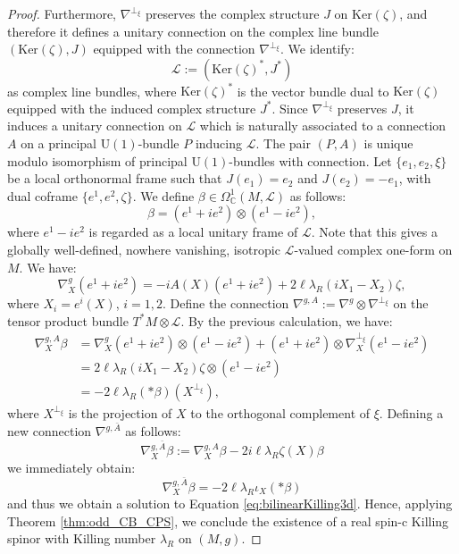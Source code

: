 \documentclass[10pt,a4paper,twoside,reqno]{amsart}
\theoremstyle{plain}
\theoremstyle{definition}
\theoremstyle{remark}
\def\U{\mathrm{U}}
\def\cL{\mathcal{L}}
\renewcommand{\ker}{\mathrm{Ker}}
\begin{document}
\begin{proof}
\noindent
Furthermore, $\nabla^{\perp_{\xi}}$ preserves the complex structure $J$ on $\ker(\zeta)$, and therefore it defines a unitary connection on the complex line bundle $(\ker(\zeta),J)$ equipped with the connection $\nabla^{\perp_{\xi}}$. We identify:
\begin{equation*}
\cL := (\ker(\zeta)^{\ast},J^{\ast})
\end{equation*}
as complex line bundles, where $\ker(\zeta)^{\ast}$ is the vector bundle dual to $\ker(\zeta)$ equipped with the induced complex structure $J^*$. Since $\nabla^{\perp_{\xi}}$ preserves $J$, it induces a unitary connection on $\cL$ which is naturally associated to a connection $A$ on a principal $\U(1)$-bundle $P$ inducing $\cL$. The pair $(P,A)$ is unique modulo isomorphism of principal $\U(1)$-bundles with connection. Let $\{e_1, e_2, \xi\}$ be a local orthonormal frame such that $J(e_1) = e_2$ and $J(e_2) = -e_1$, with dual coframe $\{e^1, e^2, \zeta\}$. We define $\beta\in \Omega^1_{\mathbb{C}}(M,\cL)$ as follows:
\begin{equation*}
\beta = (e^1 + i e^2)\otimes (e^1 - i e^2),
\end{equation*}
where $e^1-ie^2$ is regarded as a local unitary frame of $\cL$. Note that this gives a globally well-defined, nowhere vanishing, isotropic $\cL$-valued complex one-form on $M$. We have:
\begin{equation*}
\nabla^{g}_X (e^1 + i e^2) = -i A(X) (e^1 + i e^2) + 2 \ell \lambda_R (iX_1 - X_2) \zeta,
\end{equation*}
where $X_i = e^i(X)$, $i=1,2$. Define the connection $\nabla^{g,A} := \nabla^g\otimes \nabla^{\perp_{\xi}}$ on the tensor product bundle $T^{\ast}M\otimes \cL$. By the previous calculation, we have:
\begin{align*}
\nabla^{g,A}_X\beta&=\nabla^g_X(e^1+ie^2)\otimes(e^1-ie^2) + (e^1+ie^2)\otimes\nabla^{\perp_\xi}_X(e^1-ie^2)\\
&=2\ell\lambda_R(iX_1-X_2)\zeta\otimes(e^1-ie^2)\\
&=-2\ell\lambda_R(*\beta)(X^{\perp_\xi}),
\end{align*}
where $X^{\perp_{\xi}}$ is the projection of $X$ to the orthogonal complement of $\xi$. Defining a new connection $\nabla^{g,\bar{A}}$ as follows:
\begin{equation*}
\nabla^{g,\bar{A}}_X \beta := \nabla^{g,A}_X \beta - 2i\ell \lambda_R\zeta(X)\beta
\end{equation*}
we immediately obtain:
\begin{equation*}
\nabla^{g,\bar{A}}_X \beta = -2\ell\lambda_R\iota_X(*\beta)
\end{equation*}
and thus we obtain a solution to Equation \eqref{eq:bilinearKilling3d}. Hence, applying Theorem \ref{thm:odd_CB_CPS}, we conclude the existence of a real spin-c Killing spinor with Killing number $\lambda_R$ on $(M,g)$.
\end{proof}
\end{document}
